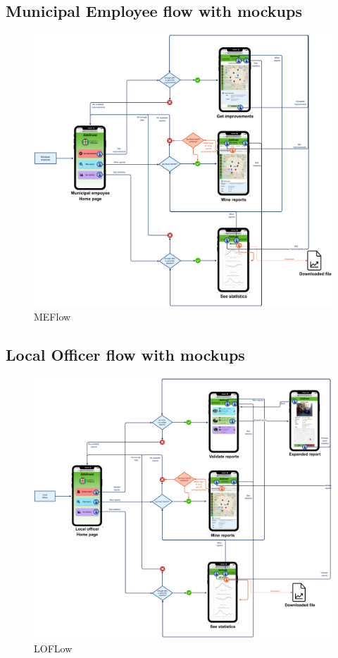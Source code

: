 			\subsection{Municipal Employee flow with mockups}
			\begin{figure}[!h]
				\centering
				\includegraphics[width=\textwidth]{images/Flow/MEFlow}
				\caption{MEFlow}
			\end{figure}
			\clearpage
			\subsection{Local Officer flow with mockups}
			\begin{figure}[!h]
				\centering
				\includegraphics[width=\textwidth]{images/Flow/LOFlow}
				\caption{LOFLow}
			\end{figure}
		